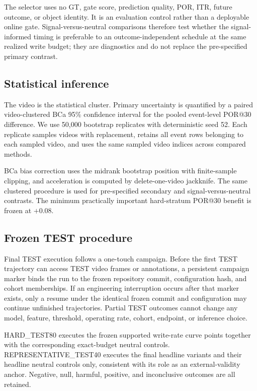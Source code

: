 \documentclass[10pt,twocolumn,letterpaper]{article}
\begin{document}
The selector uses no GT, gate score, prediction quality, POR, ITR, future
outcome, or object identity.  It is an evaluation control rather than a
deployable online gate.  Signal-versus-neutral comparisons therefore test
whether the signal-informed timing is preferable to an outcome-independent
schedule at the same realized write budget; they are diagnostics and do not
replace the pre-specified primary contrast.

\subsection{Statistical inference}

The video is the statistical cluster.  Primary uncertainty is quantified by
a paired video-clustered BCa 95\% confidence interval for the pooled
event-level POR@30 difference.  We use 50,000 bootstrap replicates with
deterministic seed 52.  Each replicate samples videos with replacement,
retains all event rows belonging to each sampled video, and uses the same
sampled video indices across compared methods.

BCa bias correction uses the midrank bootstrap position with finite-sample
clipping, and acceleration is computed by delete-one-video jackknife.  The
same clustered procedure is used for pre-specified secondary and
signal-versus-neutral contrasts.  The minimum practically important
hard-stratum POR@30 benefit is frozen at \(+0.08\).

\subsection{Frozen TEST procedure}

Final TEST execution follows a one-touch campaign.  Before the first TEST
trajectory can access TEST video frames or annotations, a persistent campaign
marker binds the run to the frozen repository commit, configuration hash, and
cohort memberships.  If an engineering interruption occurs after that marker
exists, only a resume under the identical frozen commit and configuration may
continue unfinished trajectories.  Partial TEST outcomes cannot change any
model, feature, threshold, operating rate, cohort, endpoint, or inference
choice.

HARD\_TEST80 executes the frozen supported write-rate curve points together
with the corresponding exact-budget neutral controls.  REPRESENTATIVE\_TEST40
executes the final headline variants and their headline neutral controls
only, consistent with its role as an external-validity anchor.  Negative,
null, harmful, positive, and inconclusive outcomes are all retained.
\end{document}
